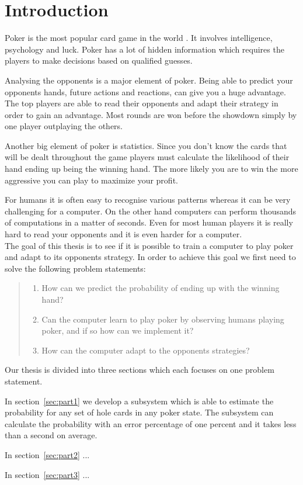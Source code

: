 \section*{Introduction}
Poker is the most popular card game in the world \cite{poker-popular}. It involves intelligence, psychology and luck. Poker has a lot of hidden information which requires the players to make decisions based on qualified guesses.  

Analysing the opponents is a major element of poker. Being able to predict your opponents hands, future actions and reactions, can give you a huge advantage. The top players are able to read their opponents and adapt their strategy in order to gain an advantage. Most rounds are won before the showdown simply by one player outplaying the others. 

Another big element of poker is statistics. Since you don't know the cards that will be dealt throughout the game players must calculate the likelihood of their hand ending up being the winning hand. The more likely you are to win the more aggressive you can play to maximize your profit. 

For humans it is often easy to recognise various patterns whereas it can be very challenging for a computer. On the other hand computers can perform thousands of computations in a matter of seconds. Even for most human players it is really hard to read your opponents and it is even harder for a computer.\\

The goal of this thesis is to see if it is possible to train a computer to play poker and adapt to its opponents strategy. In order to achieve this goal we first need to solve the following problem statements:

\begin{quotation}
  \begin{enumerate}
    \item \label{itm:q1} How can we predict the probability of ending up with the winning hand? 
    \item \label{itm:q2} Can the computer learn to play poker by observing humans playing poker, and if so how can we implement it? 
    \item \label{itm:q3} How can the computer adapt to the opponents strategies?
  \end{enumerate}
\end{quotation}


Our thesis is divided into three sections which each focuses on one problem statement.

In section~\ref{sec:part1} we develop a subsystem which is able to estimate the probability for any set of hole cards in any poker state. The subsystem can calculate the probability with an error percentage of one percent and it takes less than a second on average.

In section~\ref{sec:part2} ...

In section~\ref{sec:part3} ...
